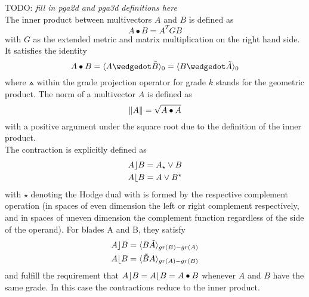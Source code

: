 TODO: \emph{fill in pga2d and pga3d definitions here} \\


The inner product between multivectors $A$ and $B$ is defined as
\begin{equation}
    A \bullet B = A^{T} G B
    \label{eg:inner_product_metric}
\end{equation}
with $G$ as the extended metric and matrix multiplication on the right hand side. It
satisfies the identity
\begin{equation}
    A \bullet B  = \grprj{A \wedgedot \tilde{B}}{0} = \grprj{ B \wedgedot \tilde{A} }{0}
    \label{eq:inner_product_link_to_gpr}
\end{equation}
where $\wedgedot$ within the grade projection operator  for grade $k$ stands
for the geometric product. The norm of a multivector $A$ is defined as
\begin{equation}
    \left \lVert {A} \right \rVert = \sqrt{A \bullet A}
    \label{eq:norm_mv}
\end{equation}
with a positive argument under the square root due to the definition of the inner product.
\\

The contraction is explicitly defined as
\begin{subequations}
    \begin{align}
    A \rfloor B & = A_{\star} \vee B
    \label{eq:lcontr} \\
    A \lfloor B & = A \vee B^{\star}
    \label{eq:rcontr}
    \end{align}
\end{subequations}
with $\star$ denoting the Hodge dual with is formed by the respective complement operation
(in spaces of even dimension the left or right complement respectively, and in spaces of
uneven dimension the complement function regardless of the side of the operand). For
blades A and B, they satisfy
\begin{subequations}
    \begin{align}
    A \rfloor B & = \langle {B \tilde{A}} \rangle_{gr(B)-gr(A)}
    \label{eq:lcontr_gpr} \\
    A \lfloor B & = \langle {\tilde{B} A} \rangle_{gr(A)-gr(B)}
    \label{eq:rcontr_gpr}
    \end{align}
\end{subequations}
and fulfill the requirement that $A \rfloor B = A \lfloor B = A \bullet B$ whenever $A$
and $B$ have the same grade. In this case the contractions reduce to the inner product. \\


